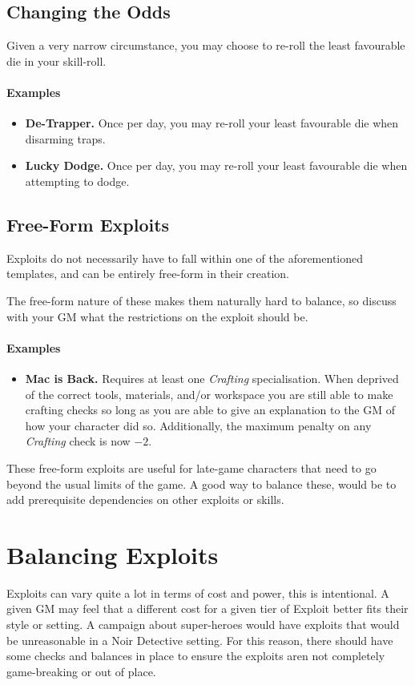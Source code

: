 \subsection{Changing the Odds}
Given a very narrow circumstance, you may choose to re-roll the least favourable die in your skill-roll.
\paragraph{Examples}
\begin{itemize}
    \item \textbf{De-Trapper.} Once per day, you may re-roll your least favourable die when disarming traps.
    \item \textbf{Lucky Dodge.} Once per day, you may re-roll your least favourable die when attempting to dodge.
\end{itemize}

\subsection{Free-Form Exploits}
Exploits do not necessarily have to fall within one of the aforementioned templates, and can be entirely free-form in their creation.

The free-form nature of these makes them naturally hard to balance, so discuss with your GM what the restrictions on the exploit should be.

\paragraph{Examples}
\begin{itemize}
    \item \textbf{Mac is Back.} Requires at least one \textit{Crafting} specialisation.
    When deprived of the correct tools, materials, and/or workspace you are still able to make crafting checks so long as you are able to give an explanation to the GM of how your character did so.
Additionally, the maximum penalty on any \textit{Crafting} check is now $-2$.
\end{itemize}

These free-form exploits are useful for late-game characters that need to go beyond the usual limits of the game. A good way to balance these, would be to add prerequisite dependencies on other exploits or skills.

\section{Balancing Exploits}\label{sec:exploit-balance}
Exploits can vary quite a lot in terms of cost and power, this is intentional. 
A given GM may feel that a different cost for a given tier of Exploit better fits their style or setting.
A campaign about super-heroes would have exploits that would be unreasonable in a Noir Detective setting.
For this reason, there should have some checks and balances in place to ensure the exploits aren not completely game-breaking or out of place.

